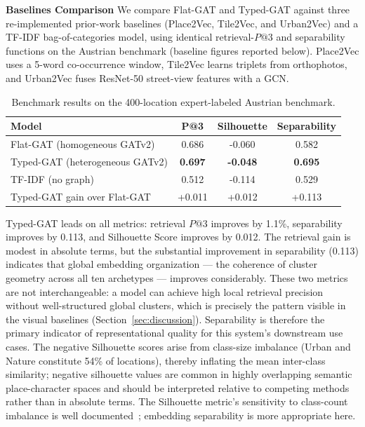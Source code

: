 \documentclass[]{interact}
\theoremstyle{plain}%
\theoremstyle{definition}
\theoremstyle{remark}
\begin{document}
\textbf{Baselines Comparison} We compare Flat-GAT and Typed-GAT against three re-implemented prior-work baselines (Place2Vec, Tile2Vec, and Urban2Vec) and a TF-IDF bag-of-categories model, using identical retrieval-$P@3$
and separability functions on the Austrian benchmark (baseline figures reported below). Place2Vec uses a 5-word co-occurrence window, Tile2Vec learns triplets from orthophotos, and Urban2Vec fuses ResNet-50 street-view features with a GCN.

\begin{table}[htbp]
\centering
\small
\begin{tabular}{lccc}
\toprule
Model & P@3 & Silhouette & Separability \\
\midrule
Flat-GAT (homogeneous GATv2) & 0.686 & -0.060 & 0.582 \\
Typed-GAT (heterogeneous GATv2) & \textbf{0.697} & \textbf{-0.048} & \textbf{0.695} \\
TF-IDF (no graph) & 0.512 & -0.114 & 0.529 \\
\midrule
Typed-GAT gain over Flat-GAT & +0.011 & +0.012 & +0.113 \\
\bottomrule
\end{tabular}
\caption{Benchmark results on the 400-location expert-labeled Austrian benchmark.}
\label{tab:benchmark}
\end{table}

Typed-GAT leads on all metrics: retrieval $P@3$ improves by 1.1\%, separability improves by 0.113, and Silhouette Score improves by 0.012. The retrieval gain is modest in absolute terms, but the substantial improvement in separability (0.113) indicates that global embedding organization --- the coherence of cluster geometry across all ten archetypes --- improves considerably. These two metrics are not interchangeable: a model can achieve high local retrieval precision without well-structured global clusters, which is precisely the pattern visible in the visual baselines (Section~\ref{sec:discussion}). Separability is therefore the primary indicator of representational quality for this system's downstream use cases. The negative Silhouette scores arise from class-size imbalance (Urban and Nature constitute 54\% of locations), thereby inflating the mean inter-class similarity; negative silhouette values are common in highly overlapping semantic place-character spaces and should be interpreted relative to competing methods rather than in absolute terms. The Silhouette metric's sensitivity to class-count imbalance is well documented~\citep{ROUSSEEUW198753}; embedding separability is more appropriate here.
\end{document}
